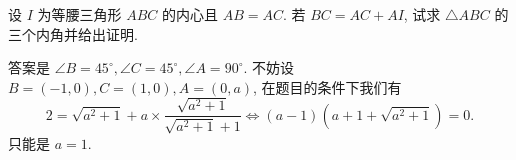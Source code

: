 \begin{prob}
\label{prob:prob-7}
设 $I$ 为等腰三角形 $ABC$ 的内心且 $AB = AC$.
若 $BC = AC + AI$, 试求 $\triangle ABC$ 的三个内角并给出证明.
\end{prob}

\begin{soln}
答案是 $\boxed{\angle B = 45^\circ, \angle C = 45^\circ, \angle A = 90^\circ.}$
不妨设 $B = (-1, 0), C = (1, 0), A = (0, a)$, 在题目的条件下我们有
\[
2 = \sqrt{a^2 + 1} + a\times \frac{\sqrt{a^2+ 1}}{\sqrt{a^2 + 1} + 1}
    \iff (a-1)(a+1+\sqrt{a^2 + 1}) = 0.
\]
只能是 $a = 1$.
\end{soln}
